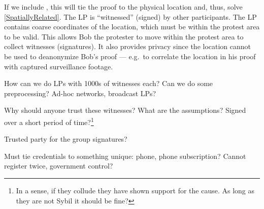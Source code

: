 If we include , this will tie the proof to the physical location and, 
thus, solve \cref{SpatiallyRelated}.
The \ac{LP} is \enquote{witnessed} (signed) by other participants.
The \ac{LP} contains coarse coordinates of the location, which must be within 
the protest area to be valid.
This allows Bob the protester to move within the protest area to collect 
witnesses (signatures).
It also provides privacy since the location cannot be used to deanonymize Bob's 
proof --- e.g.\ to correlate the location in his proof with captured 
surveillance footage.

\begin{frame}

  \pause

  \begin{question}
    How can we do \acp{LP} with 1000s of witnesses each?
    Can we do some preprocessing?
    Ad-hoc networks, broadcast \acp{LP}?
  \end{question}
  \begin{question}
    Why should anyone trust these witnesses?
    What are the assumptions?
    Signed over a short period of time?\footnote{%
      In a sense, if they collude they have shown support for the cause.
      As long as they are not Sybil it should be fine?
    }
  \end{question}
  \begin{question}
    Trusted party for the group signatures?
  \end{question}
  \begin{question}
    Must tie credentials to something unique: phone, phone subscription?
    Cannot register twice, government control?
  \end{question}
\end{frame}

